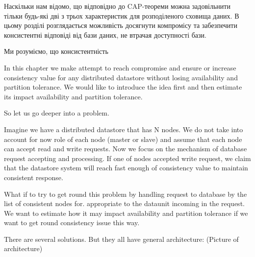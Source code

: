 \documentclass[14pt]{vakthesis}
\begin{document}
Наскільки нам відомо, що відповідно до CAP-теореми можна задовільнити тільки будь-які дві з трьох характеристик
для розподіленого сховища даних.
В цьому розділі розглядається можливість досягнути компромісу та забезпечити консистентні відповіді 
від бази даних, не втрачая доступності бази.

Ми розуміємо, що консистентність

 In this chapter we make attempt to reach compromise and ensure or increase consistency value for any distributed datastore without losing availability and partition tolerance.
We would like to introduce the idea first and then estimate its impact availability and partition tolerance.

So let us go deeper into a problem.

Imagine we have a distributed datastore that has N nodes. We do not take into account for now role of each node
(master or slave) and assume that each node can accept read and write requests. Now we focus on the mechanism
of database request accepting and processing. If one of nodes accepted write request, we claim that the
datastore system will reach fast enough of consistency value to maintain consistent response. 

What if to try to get round this problem by handling request to database by the list of consistent nodes for. appropriate to the dataunit incoming in the request.
We want to estimate how it may impact availability and partition tolerance if we want to 
get round consistency issue this way.

There are several solutions. But they all have general architecture:
(Picture of architecture)
\end{document}
